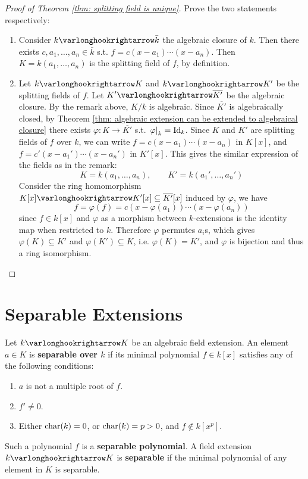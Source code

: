 \documentclass{article}
\begin{document}
\begin{proof}[Proof of Theorem \ref{thm: splitting field is unique}]
    Prove the two statements respectively:
    \begin{enumerate}[label=\arabic*)]
        \item Consider $k \ext \bar{k}$ the algebraic closure of $k$. Then there exists $c, a_1, \dots, a_n \in \bar{k}$ s.t. $f = c(x - a_1) \cdots (x - a_n)$. Then $K = k(a_1, \dots, a_n)$ is the splitting field of $f$, by definition.
        \item Let $k \ext K$ and $k \ext K'$ be the splitting fields of $f$. Let $K' \ext \overline{K'}$ be the algebraic closure. By the remark above, $K/k$ is algebraic. Since $\overline{K'}$ is algebraically closed, by Theorem \ref{thm: algebraic extension can be extended to algebraical closure} there exists $\varphi: K \to \overline{K'}$ s.t. $\left.\varphi\right|_{k} = \mathrm{Id}_k$. Since $K$ and $K'$ are splitting fields of $f$ over $k$, we can write $f = c(x - a_1) \cdots (x - a_n)$ in $K[x]$, and $f = c'(x - a_1') \cdots (x - a_n')$ in $K'[x]$. This gives the similar expression of the fields as in the remark: 
        \[
            K = k(a_1, \dots, a_n), \qquad K' = k(a_1', \dots, a_n')
        \]
        Consider the ring homomorphism $K[x] \ext K'[x] \subseteq \overline{K'}[x]$ induced by $\varphi$, we have
        \[
            f = \varphi(f) = c(x - \varphi(a_1)) \cdots (x - \varphi(a_n))
        \]
        since $f \in k[x]$ and $\varphi$ as a morphism between $k$-extensions is the identity map when restricted to $k$. Therefore $\varphi$ permutes $a_i$s, which gives $\varphi(K) \subseteq K'$ and $\varphi(K') \subseteq K$, i.e. $\varphi(K) = K'$, and $\varphi$ is bijection and thus a ring isomorphism.
    \end{enumerate}
\end{proof}

\section{Separable Extensions}

\begin{definition}\label{def: separable extension}
    Let $k \ext K$ be an algebraic field extension. An element $a \in K$ is \textbf{separable over $k$} if its minimal polynomial $f \in k[x]$ satisfies any of the following conditions:
    \begin{enumerate}[label=\arabic*)]
        \item $a$ is not a multiple root of $f$.
        \item $f' \neq 0$.
        \item Either $\mathrm{char}(k) = 0$, or $\mathrm{char}(k) = p > 0$, and $f \notin k[x^p]$.
    \end{enumerate}
    Such a polynomial $f$ is a \textbf{separable polynomial}. A field extension $k \ext K$ is \textbf{separable} if the minimal polynomial of any element in $K$ is separable. 
\end{definition}
\end{document}
